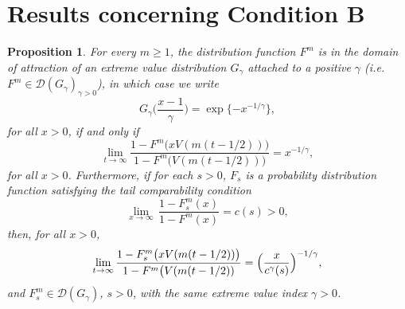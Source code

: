 \documentclass[11pt, a4paper, oneside]{article}
\numberwithin{equation}{section}
\theoremstyle{plain}
\newtheorem{prop}[thm]{Proposition}
\theoremstyle{definition}
\newcommand{\limit}[1]{\ensuremath{\displaystyle {\lim_{#1 \rightarrow{\infty}}}}}
\begin{document}

\appendix

\section{Results concerning Condition B}\label{App:CondB1}

\begin{prop}\label{Prop:DoACondMax}
    For every $m \geq 1$, the distribution function $F^m$ is in the domain of attraction of an extreme value distribution $G_{\gamma}$ attached to a positive $\gamma$ (i.e. $F^m \in \mathcal{D}(G_\gamma)_{\gamma >0}$), in which case we write \begin{equation*}
        G_{\gamma}\bigl( \frac{x-1}{\gamma} \bigr) = \exp \{ - x^{-1/\gamma}\},
    \end{equation*}
    for all $x>0$, if and only if 
    \begin{equation*}
       \lim_{t\rightarrow \infty} \frac{1-F^m\bigl( x V(m(t-1/2)) \bigr) }{ 1 - F^m \bigl( V(m(t-1/2)) \bigr)} = x^{-1/\gamma},
    \end{equation*}
    for all $x>0$. Furthermore, if for each $s> 0$, $F_s$ is a probability distribution function satisfying the tail comparability condition
    \begin{equation*}
    	\limit{x} \, \frac{1-F^m_s(x)}{1-F^m(x)} = c(s) >0,
    \end{equation*}
    then, for all $x>0$, 
    \begin{equation*}
		\lim_{t\rightarrow \infty} \frac{1-F_s^m\bigl( x V(m(t-1/2)) \bigr) }{1 - F^m \bigl( V(m(t-1/2)) } = \Bigl(\frac{x}{c^\gamma(s)}\Bigr)^{-1/\gamma},
    \end{equation*}
    and $F^m_s \in \mathcal{D}(G_\gamma)$, $s>0$, with the same extreme value index $\gamma >0$.
\end{prop}    
\end{document}
